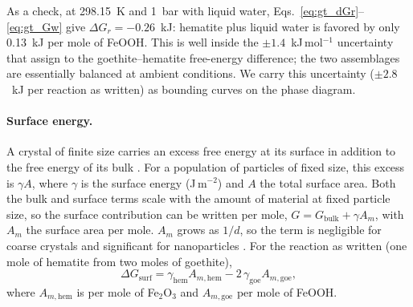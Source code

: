 As a check, at 298.15~K and 1~bar with liquid water, Eqs.~\ref{eq:gt_dGr}--\ref{eq:gt_Gw}
give $\Delta G_r = -0.26$~kJ: hematite plus liquid water is favored by only 0.13~kJ per mole of
FeOOH. This is well inside the $\pm1.4$~kJ\,mol$^{-1}$ uncertainty that \citet{majzlan2003b}
assign to the goethite--hematite free-energy difference; the two assemblages are essentially
balanced at ambient conditions. We carry this uncertainty ($\pm2.8$~kJ per reaction as written)
as bounding curves on the phase diagram.

\paragraph{Surface energy.} A crystal of finite size carries an excess free energy at its
surface in addition to the free energy of its bulk \citep{gibbs1878}. For a population of
particles of fixed size, this excess is $\gamma A$, where $\gamma$ is the surface energy
(J\,m$^{-2}$) and $A$ the total surface area. Both the bulk and surface terms scale with the
amount of material at fixed particle size, so the surface contribution can be written per mole,
$G = G_{\mathrm{bulk}} + \gamma A_m$, with $A_m$ the surface area per mole. $A_m$ grows as $1/d$,
so the term is negligible for coarse crystals and significant for nanoparticles
\citep{navrotsky2008}. For the reaction as written (one mole of hematite from two moles of
goethite),
\begin{equation}
  \Delta G_{\mathrm{surf}} = \gamma_{\mathrm{hem}} A_{m,\mathrm{hem}} - 2\,\gamma_{\mathrm{goe}} A_{m,\mathrm{goe}},
  \label{eq:gt_dGsurf}
\end{equation}
where $A_{m,\mathrm{hem}}$ is per mole of Fe$_2$O$_3$ and $A_{m,\mathrm{goe}}$ per mole of FeOOH.

